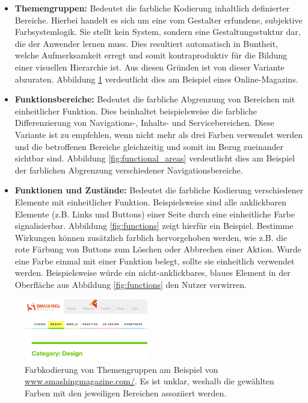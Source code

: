 \begin{itemize}
	\item \textbf{Themengruppen:} Bedeutet die farbliche Kodierung inhaltlich definierter Bereiche. Hierbei handelt es sich um eine vom Gestalter erfundene, subjektive Farbsystemlogik. Sie stellt kein System, sondern eine Gestaltungsstuktur dar, die der Anwender lernen muss. Dies resultiert automatisch in Buntheit, welche Aufmerksamkeit erregt und somit kontraproduktiv für die Bildung einer visuellen Hierarchie ist. Aus diesen Gründen ist von dieser Variante abzuraten. Abbildung \ref{fig:theme_coding} verdeutlicht dies am Beispiel eines Online-Magazins.
	\item \textbf{Funktionsbereiche:} Bedeutet die farbliche Abgrenzung von Bereichen mit einheitlicher Funktion. Dies beinhaltet beispielsweise die farbliche Differenzierung von Navigations-, Inhalts- und Servicebereichen. Diese Variante ist zu empfehlen, wenn nicht mehr als drei Farben verwendet werden und die betroffenen Bereiche gleichzeitig und somit im Bezug zueinander sichtbar sind. Abbildung \ref{fig:functional_areas} verdeutlicht dies am Beispiel der farblichen Abgrenzung verschiedener Navigationsbereiche.
	\item \textbf{Funktionen und Zustände:} Bedeutet die farbliche Kodierung verschiedener Elemente mit einheitlicher Funktion. Beispielsweise sind alle anklickbaren Elemente (z.B. Links und Buttons) einer Seite durch eine einheitliche Farbe signalisierbar. Abbildung \ref{fig:functions} zeigt hierfür ein Beispiel. Bestimme Wirkungen können zusätzlich farblich hervorgehoben werden, wie z.B. die rote Färbung von Buttons zum Löschen oder Abbrechen einer Aktion. Wurde eine Farbe einmal mit einer Funktion belegt, sollte sie einheitlich verwendet werden. Beispielsweise würde ein nicht-anklickbares, blaues Element in der Oberfläche aus Abbildung \ref{fig:functions} den Nutzer verwirren.
\end{itemize}

\begin{figure}[h]
	\centering
	\includegraphics[width=0.48\textwidth]{img/theme_coding.png}
	\caption{Farbkodierung von Themengruppen am Beispiel von \url{www.smashingmagazine.com/}. Es ist unklar, weshalb die gewählten Farben mit den jeweiligen Bereichen assoziiert werden.}
	\label{fig:theme_coding}
\end{figure}

